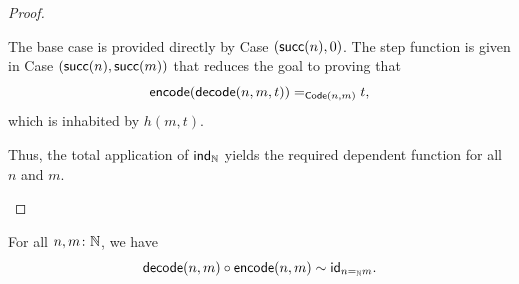 \begin{proof}
\begin{description}
\begin{enumerate}[-]
            The base case is provided directly by Case $(\mathsf{succ}(n),0)$. The step function is given in Case $(\mathsf{succ}(n),\mathsf{succ}(m))$ that reduces the goal to proving that
            \[
                \mathsf{encode}(\mathsf{decode}(n,m,t))\mathrel{=_{\mathsf{Code}(n,m)}}t,
            \]
            which is inhabited by $h(m,t)$.
        \end{enumerate}
        Thus, the total application of $\mathsf{ind}_{\mathbb{N}}$ yields the required dependent function for all $n$ and $m$.

    \end{description}
\end{proof}

\begin{thm}\label{thm:N-equality-decode-encode}
    For all\/ $n,m\colon\N$, we have
    \[
        \mathsf{decode}(n,m)\circ\mathsf{encode}(n,m)\sim\mathsf{id}_{n\mathrel{=_{\mathbb{N}}} m}.
    \]  
\end{thm}

